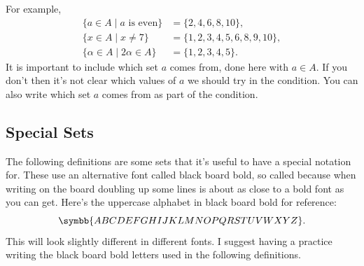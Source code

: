 \documentclass[fleqn]{LectureClass/LectureClass}
\begin{document}
    For example,
    \begin{align}
        \{a \in A \mid a \text{ is even}\} &= \{2, 4, 6, 8, 10\},\\
        \{x \in A \mid x \ne 7\} &= \{1, 2, 3, 4, 5, 6, 8, 9, 10\},\\
        \{\alpha \in A \mid 2\alpha \in A\} &= \{1, 2, 3, 4, 5\}.
    \end{align}
    It is important to include which set \(a\) comes from, done here with \(a \in A\).
    If you don't then it's not clear which values of \(a\) we should try in the condition.
    You can also write which set \(a\) comes from as part of the condition.
    
    \subsection{Special Sets}
    The following definitions are some sets that it's useful to have a special notation for.
    These use an alternative font called black board bold, so called because when writing on the board doubling up some lines is about as close to a bold font as you can get.
    Here's the uppercase alphabet in black board bold for reference:
    \begin{equation}
        \symbb{ABCDEFGHIJKLMNOPQRSTUVWXYZ}.
    \end{equation}
    This will look slightly different in different fonts.
    I suggest having a practice writing the black board bold letters used in the following definitions.
    
\end{document}
